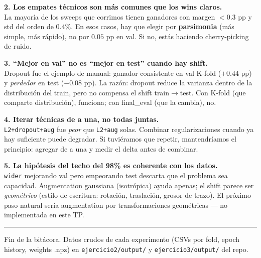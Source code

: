 \documentclass[11pt,a4paper]{article}
\newcommand{\code}[1]{\texttt{\textcolor{accent}{#1}}}
\newcommand{\file}[1]{\texttt{\small #1}}
\begin{document}
\begin{aprendimos}
\textbf{2. Los empates técnicos son más comunes que los wins claros.}\\
La mayoría de los sweeps que corrimos tienen ganadores con margen $<0.3$ pp y std del orden de $0.4\%$. En esos casos, hay que elegir por \textbf{parsimonia} (más simple, más rápido), no por $0.05$ pp en val. Si no, estás haciendo cherry-picking de ruido.
\end{aprendimos}

\begin{aprendimos}
\textbf{3. ``Mejor en val'' no es ``mejor en test'' cuando hay shift.}\\
Dropout fue el ejemplo de manual: ganador consistente en val K-fold ($+0.44$ pp) y \emph{perdedor} en test ($-0.08$ pp). La razón: dropout reduce la varianza dentro de la distribución del train, pero no compensa el shift train$\to$test. Con K-fold (que comparte distribución), funciona; con final\_eval (que la cambia), no.
\end{aprendimos}

\begin{aprendimos}
\textbf{4. Iterar técnicas de a una, no todas juntas.}\\
\code{L2+dropout+aug} fue \emph{peor} que \code{L2+aug} solas. Combinar regularizaciones cuando ya hay suficiente puede degradar. Si tuviéramos que repetir, mantendríamos el principio: agregar de a una y medir el delta antes de combinar.
\end{aprendimos}

\begin{aprendimos}
\textbf{5. La hipótesis del techo del 98\% es coherente con los datos.}\\
\code{wider} mejorando val pero empeorando test descarta que el problema sea capacidad. Augmentation gaussiana (isotrópica) ayuda apenas; el shift parece ser \emph{geométrico} (estilo de escritura: rotación, traslación, grosor de trazo). El próximo paso natural sería augmentation por transformaciones geométricas — no implementada en este TP.
\end{aprendimos}

\bigskip
\noindent\rule{\linewidth}{0.4pt}\par
\smallskip
\noindent\textcolor{muted}{\small Fin de la bitácora. Datos crudos de cada experimento (CSVs por fold, epoch history, weights .npz) en \file{ejercicio2/output/} y \file{ejercicio3/output/} del repo.}
\end{document}
